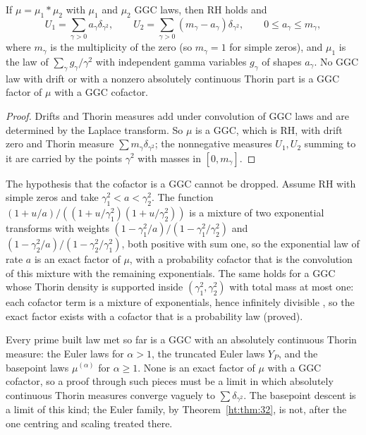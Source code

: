 \begin{theorem}\label{ht:thm:rigid}
If $\mu=\mu_1*\mu_2$ with $\mu_1$ and $\mu_2$ GGC laws, then RH holds and
\[
U_1=\sum_{\gamma>0}a_\gamma\delta_{\gamma^2},\qquad U_2=\sum_{\gamma>0}(m_\gamma-a_\gamma)\delta_{\gamma^2},\qquad0\le a_\gamma\le m_\gamma ,
\]
where $m_\gamma$ is the multiplicity of the zero (so $m_\gamma=1$ for simple zeros), and $\mu_1$ is the law of $\sum_\gamma g_\gamma/\gamma^2$ with independent gamma variables $g_\gamma$ of shapes $a_\gamma$. No GGC law with drift or with a nonzero absolutely continuous Thorin part is a GGC factor of $\mu$ with a GGC cofactor.
\end{theorem}

\begin{proof}
Drifts and Thorin measures add under convolution of GGC laws and are determined by the Laplace transform. So $\mu$ is a GGC, which is RH, with drift zero and Thorin measure $\sum m_\gamma\delta_{\gamma^2}$; the nonnegative measures $U_1,U_2$ summing to it are carried by the points $\gamma^2$ with masses in $[0,m_\gamma]$.
\end{proof}

The hypothesis that the cofactor is a GGC cannot be dropped. Assume RH with simple zeros and take $\gamma_1^2<a<\gamma_2^2$. The function $(1+u/a)/((1+u/\gamma_1^2)(1+u/\gamma_2^2))$ is a mixture of two exponential transforms with weights $(1-\gamma_1^2/a)/(1-\gamma_1^2/\gamma_2^2)$ and $(1-\gamma_2^2/a)/(1-\gamma_2^2/\gamma_1^2)$, both positive with sum one, so the exponential law of rate $a$ is an exact factor of $\mu$, with a probability cofactor that is the convolution of this mixture with the remaining exponentials. The same holds for a GGC whose Thorin density is supported inside $(\gamma_1^2,\gamma_2^2)$ with total mass at most one: each cofactor term is a mixture of exponentials, hence infinitely divisible \cite{Goldie67,Steutel67}, so the exact factor exists with a cofactor that is a probability law (proved).

Every prime built law met so far is a GGC with an absolutely continuous Thorin measure: the Euler laws for $\alpha>1$, the truncated Euler laws $Y_P$, and the basepoint laws $\mu^{(\alpha)}$ for $\alpha\ge1$. None is an exact factor of $\mu$ with a GGC cofactor, so a proof through such pieces must be a limit in which absolutely continuous Thorin measures converge vaguely to $\sum\delta_{\gamma^2}$. The basepoint descent is a limit of this kind; the Euler family, by Theorem~\ref{ht:thm:32}, is not, after the one centring and scaling treated there.

